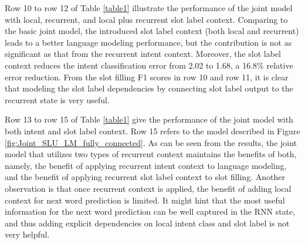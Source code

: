 \documentclass[11pt]{article}
\begin{document}
    Row 10 to row 12 of Table \ref{table1} illustrate the performance of the joint model with local, recurrent, and local plus recurrent slot label context. Comparing to the basic joint model, the introduced slot label context (both local and recurrent) leads to a better language modeling performance, but the contribution is not as significant as that from the recurrent intent context. Moreover, the slot label context reduces the intent classification error from 2.02 to 1.68, a 16.8\% relative error reduction. From the slot filling F1 scores in row 10 and row 11, it is clear that modeling the slot label dependencies by connecting slot label output to the recurrent state is very useful.
    
    Row 13 to row 15 of Table \ref{table1} give the performance of the joint model with both intent and slot label context. Row 15 refers to the model described in Figure \ref{fig:Joint_SLU_LM_fully_connected}. As can be seen from the results, the joint model that utilizes two types of recurrent context maintains the benefits of both, namely, the benefit of applying recurrent intent context to language modeling, and the benefit of applying recurrent slot label context to slot filling. Another observation is that once recurrent context is applied, the benefit of adding local context for next word prediction is limited. It might hint that the most useful information for the next word prediction can be well captured in the RNN state, and thus adding explicit dependencies on local intent class and slot label is not very helpful.
\end{document}

